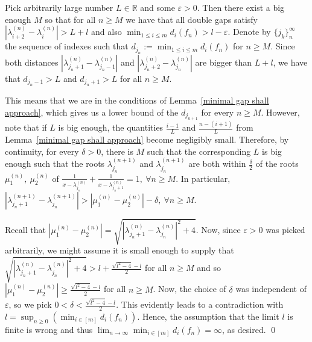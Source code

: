 \documentclass[11pt]{article}
\begin{document}
Pick arbitrarily large number $L\in\mathbb{R}$ and some $\varepsilon > 0$. Then there exist a big enough $M$ so that for all $n\geq M$ we have that all double gaps satisfy $|\lambda^{(n)}_{i+2} - \lambda^{(n)}_i| > L + l$ and also $\min_{1\leq i \leq m} d_i (f_n)> l - \varepsilon$. Denote by $\{j_k\}_{n}^{\infty}$ the sequence of indexes such that $d_{j_n}:=\min_{1\leq i \leq m} d_i (f_n)$ for $n\geq M$. Since both distances $|\lambda^{(n)}_{j_n+1} - \lambda^{(n)}_{j_n-1}|$ and $|\lambda^{(n)}_{j_n+2} - \lambda^{(n)}_{j_n}|$ are bigger than $L + l$, we have that $d_{j_n-1}> L$ and $d_{j_n+1} > L$ for all $n\geq M$.

This means that we are in the conditions of Lemma~\ref{minimal gap shall approach}, which gives us a lower bound of the $d_{j_{n+1}}$ for every $n\geq M$. However, note that if $L$ is big enough, the quantities $\frac{i-1}{L}$ and $\frac{n-(i+1)}{L}$ from Lemma~\ref{minimal gap shall approach} become negligibly small. Therefore, by continuity, for every $\delta > 0$, there is $M$ such that the corresponding $L$ is big enough such that the roots $\lambda^{(n+1)}_{j_n}$ and $\lambda^{(n+1)}_{j_n}$ are both within $\frac{\delta}{2}$ of the roots $\mu^{(n)}_1,~\mu^{(n)}_2$ of $\frac{1}{x-\lambda^{(n)}_{j_n}} + \frac{1}{x-\lambda^{(n)}_{j_n+1}} = 1,~\forall n\geq M$. In particular, $|\lambda^{(n+1)}_{j_n+1} - \lambda^{(n+1)}_{j_n}|>|\mu^{(n)}_1 - \mu^{(n)}_2| - \delta,~\forall n\geq M$.

Recall that $|\mu^{(n)}_1 - \mu^{(n)}_2|= \sqrt{|\lambda^{(n)}_{j_n+1} - \lambda^{(n)}_{j_n}|^2 + 4}$. Now, since $\varepsilon > 0$ was picked arbitrarily, we might assume it is small enough to supply that $\sqrt{|\lambda^{(n)}_{j_n+1} - \lambda^{(n)}_{j_n}|^2 + 4} >l + \frac{\sqrt{l^2 -4} - l}{2}$ for all $n\ge M$ and so $|\mu^{(n)}_1 - \mu^{(n)}_2|\ge \frac{\sqrt{l^2 -4} - l}{2}$ for all $n\ge M$. Now, the choice of $\delta$ was independent of $\varepsilon$, so we pick $0< \delta <\frac{\sqrt{l^2 -4} - l}{2}$. This evidently leads to a contradiction with $l = \sup_{n\ge 0} (\min_{i \in [m]} d_i (f_n))$. Hence, the assumption that the limit $l$ is finite is wrong and thus $\lim_{n\to\infty} \min_{i \in [m]} d_i (f_n) = \infty$, as desired. \qed
\end{document}
